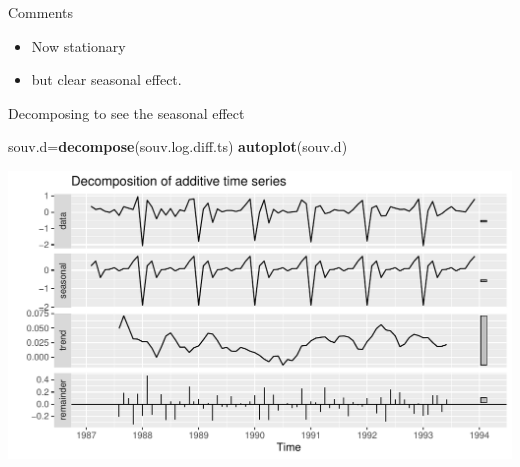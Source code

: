 \documentclass[ignorenonframetext,]{beamer}
\newenvironment{Shaded}{\begin{snugshade}}{\end{snugshade}}
\newcommand{\KeywordTok}[1]{\textcolor[rgb]{0.13,0.29,0.53}{\textbf{#1}}}
\newcommand{\NormalTok}[1]{#1}
\providecommand{\tightlist}{%
  \setlength{\itemsep}{0pt}\setlength{\parskip}{0pt}}
\begin{document}
\begin{frame}{Comments}
\protect\hypertarget{comments-48}{}

\begin{itemize}
\tightlist
\item
  Now stationary
\item
  but clear seasonal effect.
\end{itemize}

\end{frame}

\begin{frame}[fragile]{Decomposing to see the seasonal effect}
\protect\hypertarget{decomposing-to-see-the-seasonal-effect}{}

\begin{Shaded}
\begin{Highlighting}[]
\NormalTok{souv.d=}\KeywordTok{decompose}\NormalTok{(souv.log.diff.ts)}
\KeywordTok{autoplot}\NormalTok{(souv.d)}
\end{Highlighting}
\end{Shaded}

\includegraphics{figure/unnamed-chunk-594-1.pdf}

\end{frame}
\end{document}
